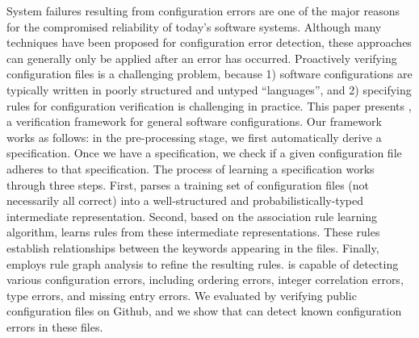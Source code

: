 
System failures resulting from configuration errors are one of the major reasons for the compromised reliability of today's software systems. 
Although many techniques have been proposed for configuration error detection, these approaches can generally only be applied after an error has occurred. 
Proactively verifying configuration files is a challenging problem, because 
  1) software configurations are typically written in poorly structured and untyped ``languages'', and 
  2) specifying rules for configuration verification is challenging in practice.
This paper presents \app, a verification framework for general software configurations.
Our framework works as follows: in the pre-processing stage, we first automatically derive a specification.
Once we have a specification, we check if a given configuration file adheres to that specification.
The process of learning a specification works through three steps.
First, \app parses a training set of configuration files (not necessarily all correct) into a well-structured and probabilistically-typed intermediate representation.
Second, based on the association rule learning algorithm, \app learns rules from these intermediate representations. 
These rules establish relationships between the keywords appearing in the files. 
Finally, \app employs rule graph analysis to refine the resulting rules. 
\app is capable of detecting various configuration errors, including ordering errors, integer correlation errors, type errors, and missing entry errors. 
We evaluated \app by verifying public configuration files on Github, and we show that \app can detect known configuration errors in these files.

